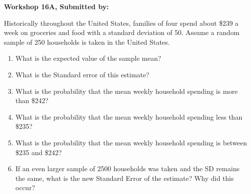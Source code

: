 \documentclass[11pt]{book}\usepackage[]{graphicx}\usepackage[]{color}
\begin{document}
\begin{exercises}
\begin{exercise}
\end{exercise}
\begin{solution}  %

\end{solution}

\clearpage

    \begin{exercise}  %

    \begin{center}
\begin{flushleft}\textbf{\large \hfill Workshop 16A, Submitted by: }\end{flushleft}

\end{center}


Historically throughout the United States, families of four spend about \$239 a week on groceries and food with a standard deviation of 50. Assume a random sample of 250 households is taken in the United States.

\begin{enumerate}
\item What is the expected value of the sample mean?
\item What is the Standard error of this estimate?
\item What is the probability that the mean weekly household spending is more than \$242?
\item What is the probability that the mean weekly household spending less than \$235?
\item What is the probability that the mean weekly household spending is between \$235 and \$242?
\item If an even larger sample of 2500 households was taken and the SD remains the same, what is the new Standard Error of the estimate? Why did this occur?
\end{enumerate}


\end{exercise}
\end{exercises}
\end{document}
